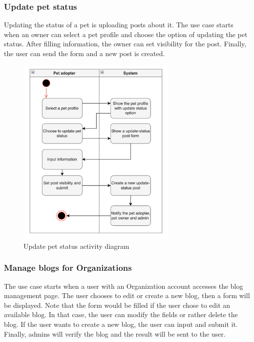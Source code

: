 \subsubsection{Update pet status}

Updating the status of a pet is uploading posts about it. The use case starts when an owner can select a pet profile and choose the option of updating the pet status. After filling information, the owner can set visibility for the post. Finally, the user can send the form and a new post is created.

\begin{figure}[H]
  \centering
  \includegraphics[width=0.7\textwidth]{Figures/pet_status.png}
  \caption{Update pet status activity diagram}
  \label{fig:update-pet-status}
\end{figure}

\subsubsection{Manage blogs for Organizations}

The use case starts when a user with an Organization account accesses the blog management page. The user chooses to edit or create a new blog, then a form will be displayed. Note that the form would be filled if the user chose to edit an available blog. In that case, the user can modify the fields or rather delete the blog. If the user wants to create a new blog, the user can input and submit it. Finally, admins will verify the blog and the result will be sent to the user.

